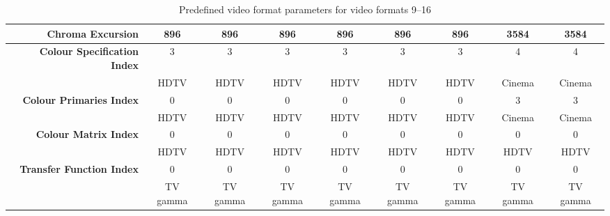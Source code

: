 \begin{sidewaystable}[!ht]
\begin{tabular}{|r|c|c|c|c|c|c|c|c|}
{\bf Chroma Excursion} &896 &896 &896 &896 &896 &896 &3584 & 3584\\
\hline
{\bf Colour Specification Index} &3 & 3 & 3& 3&	3&3 & 4& 4\\
&HDTV&HDTV&HDTV&HDTV&HDTV&HDTV&Cinema&Cinema\\
\hline
{\bf Colour Primaries Index} &0&	0&0&0&0&0&3&3\\
&HDTV&HDTV&HDTV&HDTV&HDTV&HDTV&Cinema&Cinema\\
\hline
{\bf Colour Matrix Index} &0&0&0&0&0&0&0&0\\
&HDTV&HDTV&HDTV&HDTV&HDTV&HDTV&HDTV&HDTV\\
\hline
{\bf Transfer Function Index} &0&0&0&0&0&0&0&0\\
&TV gamma&TV gamma&TV gamma&TV gamma&TV gamma&TV gamma&TV gamma&TV gamma\\
\hline
\end{tabular}
\caption{Predefined video format parameters for video formats 9--16}
\end{sidewaystable}


